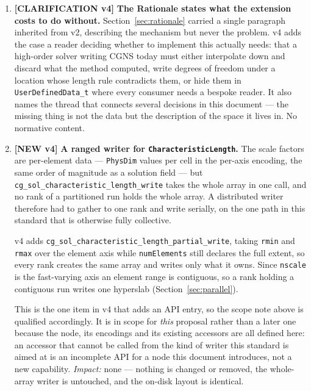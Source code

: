 \documentclass[11pt,letterpaper]{article}
\newif\ifvfourdraft
\newenvironment{v4block}{\ifvfourdraft\color{v4violet}\fi\ignorespaces}{\par}
\newcommand{\NEWIV}{\ifvfourdraft
  \textcolor{v4violet}{\textbf{[NEW v4]}}\else
  \textcolor{newgreen}{\textbf{[NEW v4]}}\fi}
\newcommand{\CLARIFYIV}{\ifvfourdraft
  \textcolor{v4violet}{\textbf{[CLARIFICATION v4]}}\else
  \textcolor{clarifybrown}{\textbf{[CLARIFICATION v4]}}\fi}
\begin{document}
{\begin{v4block}
\begin{enumerate}[leftmargin=1.4em,itemsep=0.5em]
    The third is an \emph{upper bound}, deliberately.  An earlier review asked for
    equality against \texttt{cg\_solution\_lagrange\_interpolation\_size}; that
    would reject the serendipity spaces this standard supports, since an
    edge-serendipity \texttt{QUAD} at $p=2$ carries $4p=8$ control points against
    a complete-space $(p+1)^2=9$.  A set larger than the complete space cannot be
    unisolvent for a degree-$p$ space and is always an error; a smaller one is an
    incomplete space and is legal.  \textit{Impact:} none to conformant files.

  \item \CLARIFYIV{} \textbf{The Rationale states what the extension costs to do
    without.}  Section~\ref{sec:rationale} carried a single paragraph inherited
    from v2, describing the mechanism but never the problem.  v4 adds the case a
    reader deciding whether to implement this actually needs: that a high-order
    solver writing CGNS today must either interpolate down and discard what the
    method computed, write degrees of freedom under a location whose length rule
    contradicts them, or hide them in \texttt{UserDefinedData\_t} where every
    consumer needs a bespoke reader.  It also names the thread that connects
    several decisions in this document --- the missing thing is not the data but
    the description of the space it lives in.  No normative content.

  \item \NEWIV{} \textbf{A ranged writer for \texttt{CharacteristicLength}.}
    The scale factors are per-element data --- \texttt{PhysDim} values per cell in
    the per-axis encoding, the same order of magnitude as a solution field --- but
    \texttt{cg\_sol\_characteristic\_length\_write} takes the whole array in one
    call, and no rank of a partitioned run holds the whole array.  A distributed
    writer therefore had to gather to one rank and write serially, on the one path
    in this standard that is otherwise fully collective.

    v4 adds \texttt{cg\_sol\_characteristic\_length\_partial\_write}, taking
    \texttt{rmin} and \texttt{rmax} over the element axis while
    \texttt{numElements} still declares the full extent, so every rank creates the
    same array and writes only what it owns.  Since \texttt{nscale} is the
    fast-varying axis an element range is contiguous, so a rank holding a
    contiguous run writes one hyperslab (Section~\ref{sec:parallel}).

    This is the one item in v4 that adds an API entry, so the scope note above is
    qualified accordingly.  It is in scope for \emph{this} proposal rather than a
    later one because the node, its encodings and its existing accessors are all
    defined here: an accessor that cannot be called from the kind of writer this
    standard is aimed at is an incomplete API for a node this document
    introduces, not a new capability.  \textit{Impact:} none --- nothing is
    changed or removed, the whole-array writer is untouched, and the on-disk
    layout is identical.


\end{enumerate}
\end{v4block}}
\end{document}
